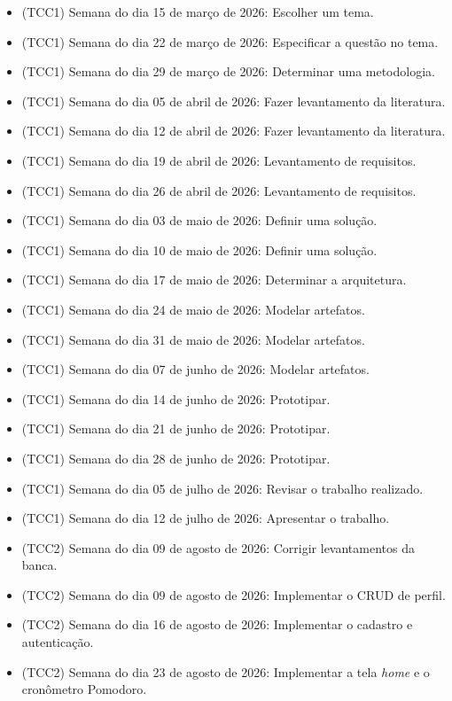 \begin{itemize}
    \item (TCC1) Semana do dia 15 de março de 2026: Escolher um tema.
    \item (TCC1) Semana do dia 22 de março de 2026: Especificar a questão no tema.
    \item (TCC1) Semana do dia 29 de março de 2026: Determinar uma metodologia.
    \item (TCC1) Semana do dia 05 de abril de 2026: Fazer levantamento da literatura.
    \item (TCC1) Semana do dia 12 de abril de 2026: Fazer levantamento da literatura.
    \item (TCC1) Semana do dia 19 de abril de 2026: Levantamento de requisitos.
    \item (TCC1) Semana do dia 26 de abril de 2026: Levantamento de requisitos.
    \item (TCC1) Semana do dia 03 de maio de 2026: Definir uma solução.
    \item (TCC1) Semana do dia 10 de maio de 2026: Definir uma solução.
    \item (TCC1) Semana do dia 17 de maio de 2026: Determinar a arquitetura.
    \item (TCC1) Semana do dia 24 de maio de 2026: Modelar artefatos.
    \item (TCC1) Semana do dia 31 de maio de 2026: Modelar artefatos.
    \item (TCC1) Semana do dia 07 de junho de 2026: Modelar artefatos.
    \item (TCC1) Semana do dia 14 de junho de 2026: Prototipar.
    \item (TCC1) Semana do dia 21 de junho de 2026: Prototipar.
    \item (TCC1) Semana do dia 28 de junho de 2026: Prototipar.
    \item (TCC1) Semana do dia 05 de julho de 2026: Revisar o trabalho realizado.
    \item (TCC1) Semana do dia 12 de julho de 2026: Apresentar o trabalho.
    \item (TCC2) Semana do dia 09 de agosto de 2026: Corrigir levantamentos da banca.
    \item (TCC2) Semana do dia 09 de agosto de 2026: Implementar o CRUD de perfil.
    \item (TCC2) Semana do dia 16 de agosto de 2026: Implementar o cadastro e autenticação.
    \item (TCC2) Semana do dia 23 de agosto de 2026: Implementar a tela \textit{home} e o cronômetro Pomodoro.

\end{itemize}
